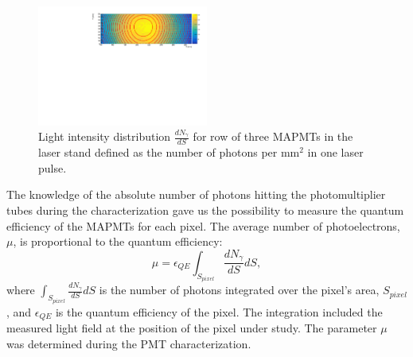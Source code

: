 \begin{figure}[h]
\centering
\includegraphics[width=0.5\textwidth]{figures/photon_flux.pdf}
\caption{Light intensity distribution $\frac {dN_\gamma}{dS}$ for row of three MAPMTs in the laser stand defined as the number of photons per mm$^2$ in  one laser pulse.}
\label{fig:light_flux}
\end{figure}

The knowledge of the absolute number of photons hitting the photomultiplier tubes during the characterization gave us the possibility to measure the quantum efficiency of the MAPMTs for each pixel. The average number of photoelectrons, $\mu$, is proportional to the quantum efficiency:
$$
\mu=\epsilon_{QE} \int_{S_{pixel}}\frac {dN_\gamma}{dS} dS,
$$
\noindent
where $\int_{S_{pixel}}\frac {dN_\gamma}{dS} dS$ is the number of photons integrated over the pixel's area, $S_{pixel}$, and $\epsilon_{QE}$ is the quantum efficiency of the pixel.
The integration included the measured light field at the position of the pixel under study.
The parameter $\mu$ was determined during the PMT characterization.